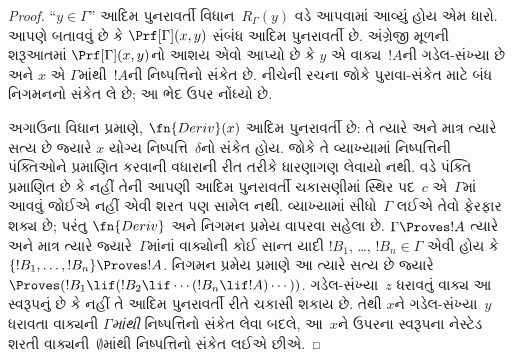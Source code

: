 \begin{proof}
``$y \in \Gamma$'' આદિમ પુનરાવર્તી
વિધાન~$R_\Gamma(y)$ વડે આપવામાં
આવ્યું હોય એમ ધારો. આપણે બતાવવું છે
કે $\Prf[\Gamma](x, y)$ સંબંધ આદિમ
પુનરાવર્તી છે. અંગ્રેજી મૂળની
શરૂઆતમાં $\Prf[\Gamma](x, y)$નો
આશય એવો આપ્યો છે કે
$y$ એ વાક્ય~$!A$ની
ગડેલ-સંખ્યા છે અને $x$ એ
$\Gamma$માંથી~$!A$ની
નિષ્પત્તિનો સંકેત છે. નીચેની
રચના જોકે પુરાવા-સંકેત માટે બંધ નિગમનનો
સંકેત લે છે; આ ભેદ ઉપર નોંધ્યો છે.

અગાઉના વિધાન પ્રમાણે,
$\fn{Deriv}(x)$ આદિમ પુનરાવર્તી છે:
તે ત્યારે અને માત્ર ત્યારે સત્ય છે
જ્યારે $x$ યોગ્ય
નિષ્પત્તિ~$\delta$નો સંકેત હોય.
જોકે તે વ્યાખ્યામાં નિષ્પત્તિની પંક્તિઓને
પ્રમાણિત કરવાની વધારાની રીત તરીકે
ધારણાગણ લેવાયો નથી. \QR{} વડે
પંક્તિ પ્રમાણિત છે કે નહીં તેની
આપણી આદિમ પુનરાવર્તી ચકાસણીમાં
સ્થિર પદ~$c$ એ~$\Gamma$માં આવવું
જોઈએ નહીં એવી શરત પણ સામેલ નથી.
વ્યાખ્યામાં સીધો~$\Gamma$ લઈએ તેવો
ફેરફાર શક્ય છે; પરંતુ
$\fn{Deriv}$ અને નિગમન પ્રમેય
વાપરવા સહેલા છે.
$\Gamma \Proves !A$ ત્યારે અને માત્ર
ત્યારે જ્યારે~$\Gamma$માંનાં
વાક્યોની કોઈ સાન્ત યાદી
$!B_1$, \dots, $!B_n \in
\Gamma$ એવી હોય કે
$\{!B_1, \dots, !B_n\} \Proves !A$.
નિગમન પ્રમેય પ્રમાણે આ ત્યારે
સત્ય છે જ્યારે
$\Proves (!B_1 \lif (!B_2 \lif
\cdots (!B_n \lif !A)\cdots))$.
ગડેલ-સંખ્યા~$z$ ધરાવતું
વાક્ય આ સ્વરૂપનું છે કે
નહીં તે આદિમ પુનરાવર્તી રીતે
ચકાસી શકાય છે. તેથી $x$ને
ગડેલ-સંખ્યા~$y$ ધરાવતા
વાક્યની \emph{$\Gamma$માંથી}
નિષ્પત્તિનો સંકેત લેવા બદલે,
આ~$x$ને ઉપરના સ્વરૂપના નેસ્ટેડ
શરતી વાક્યની~$\emptyset$માંથી
નિષ્પત્તિનો સંકેત લઈએ છીએ.


\end{proof}
